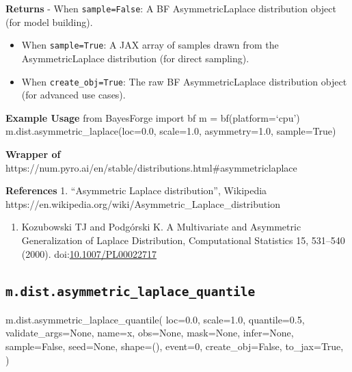 \documentclass[
  letterpaper,
  DIV=11,
  numbers=noendperiod]{scrartcl}
\newenvironment{Shaded}{\begin{snugshade}}{\end{snugshade}}
\newcommand{\DecValTok}[1]{\textcolor[rgb]{0.68,0.00,0.00}{#1}}
\newcommand{\FloatTok}[1]{\textcolor[rgb]{0.68,0.00,0.00}{#1}}
\newcommand{\NormalTok}[1]{\textcolor[rgb]{0.00,0.23,0.31}{#1}}
\newcommand{\OperatorTok}[1]{\textcolor[rgb]{0.37,0.37,0.37}{#1}}
\newcommand{\StringTok}[1]{\textcolor[rgb]{0.13,0.47,0.30}{#1}}
\newcommand{\VariableTok}[1]{\textcolor[rgb]{0.07,0.07,0.07}{#1}}
\providecommand{\tightlist}{%
  \setlength{\itemsep}{0pt}\setlength{\parskip}{0pt}}\usepackage{longtable,booktabs,array}
\begin{document}
\textbf{Returns} - When \texttt{sample=False}: A BF AsymmetricLaplace
distribution object (for model building).

\begin{itemize}
\item
  When \texttt{sample=True}: A JAX array of samples drawn from the
  AsymmetricLaplace distribution (for direct sampling).
\item
  When \texttt{create\_obj=True}: The raw BF AsymmetricLaplace
  distribution object (for advanced use cases).
\end{itemize}

\textbf{Example Usage} from BayesForge import bf m = bf(platform=`cpu')
m.dist.asymmetric\_laplace(loc=0.0, scale=1.0, asymmetry=1.0,
sample=True)

\textbf{Wrapper of}
https://num.pyro.ai/en/stable/distributions.html\#asymmetriclaplace

\textbf{References} 1. ``Asymmetric Laplace distribution'', Wikipedia
https://en.wikipedia.org/wiki/Asymmetric\_Laplace\_distribution

\begin{enumerate}
\def\labelenumi{\arabic{enumi}.}
\setcounter{enumi}{1}
\tightlist
\item
  Kozubowski TJ and Podgórski K. A Multivariate and Asymmetric
  Generalization of Laplace Distribution, Computational Statistics 15,
  531--540 (2000).
  doi:\href{https://doi.org/10.1007/PL00022717}{10.1007/PL00022717}
\end{enumerate}

\subsection{\texorpdfstring{\texttt{m.dist.asymmetric\_laplace\_quantile}}{m.dist.asymmetric\_laplace\_quantile}}\label{asymmetric_laplace_quantile}

\begin{Shaded}
\begin{Highlighting}[]
\NormalTok{m.dist.asymmetric\_laplace\_quantile(}
\NormalTok{    loc}\OperatorTok{=}\FloatTok{0.0}\NormalTok{,}
\NormalTok{    scale}\OperatorTok{=}\FloatTok{1.0}\NormalTok{,}
\NormalTok{    quantile}\OperatorTok{=}\FloatTok{0.5}\NormalTok{,}
\NormalTok{    validate\_args}\OperatorTok{=}\VariableTok{None}\NormalTok{,}
\NormalTok{    name}\OperatorTok{=}\StringTok{\textquotesingle{}x\textquotesingle{}}\NormalTok{,}
\NormalTok{    obs}\OperatorTok{=}\VariableTok{None}\NormalTok{,}
\NormalTok{    mask}\OperatorTok{=}\VariableTok{None}\NormalTok{,}
\NormalTok{    infer}\OperatorTok{=}\VariableTok{None}\NormalTok{,}
\NormalTok{    sample}\OperatorTok{=}\VariableTok{False}\NormalTok{,}
\NormalTok{    seed}\OperatorTok{=}\VariableTok{None}\NormalTok{,}
\NormalTok{    shape}\OperatorTok{=}\NormalTok{(),}
\NormalTok{    event}\OperatorTok{=}\DecValTok{0}\NormalTok{,}
\NormalTok{    create\_obj}\OperatorTok{=}\VariableTok{False}\NormalTok{,}
\NormalTok{    to\_jax}\OperatorTok{=}\VariableTok{True}\NormalTok{,}
\NormalTok{)}
\end{Highlighting}
\end{Shaded}
\end{document}
